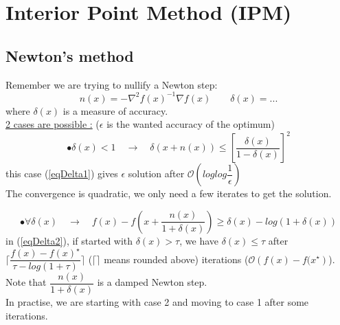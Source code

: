 \documentclass[10pt,a4paper]{article}
\begin{document}
\section{Interior Point Method (IPM)}
\subsection{Newton's method}
Remember we are trying to nullify a Newton step:
$$n(x) = - \nabla^2 f(x)^{-1} \nabla f(x) \qquad \delta (x) = ... $$
where $\delta (x)$ is a measure of accuracy.\\
\underline{2 cases are possible :} ($\epsilon$ is the wanted accuracy of the optimum)
\begin{equation}
\label{eqDelta1}
 \bullet\delta (x) < 1 \quad \rightarrow \quad \delta (x + n(x)) \leq \left[ \dfrac{\delta (x)}{1 - \delta (x)} \right]^2 
\end{equation}
this case (\ref{eqDelta1}) gives $\epsilon$ solution after $\mathcal{O} (log log \dfrac{1}{\epsilon})$\\
The convergence is quadratic, we only need a few iterates to get the solution.

\begin{equation}
\label{eqDelta2}
\bullet\forall \delta(x) \quad \rightarrow \quad f(x) - f\left(x + \dfrac{n(x)}{1 + \delta(x)}\right) \geq \delta(x) - log(1 + \delta(x))
\end{equation}
in (\ref{eqDelta2}), if started with $\delta(x) > \tau $, we have $\delta(x) \leq \tau$ after $\lceil\dfrac{f(x) - f(x)^{\star}}{\tau - log(1 + \tau)}\rceil$ ($\lceil \rceil$ means rounded above) iterations ($\mathcal{O}\left(f(x)-f(x^{\star}\right)$). \\
Note that $\dfrac{n(x)}{1 + \delta(x)}$ is a damped Newton step.\\
In practise, we are starting with case 2 and moving to case 1 after some iterations.
\end{document}
